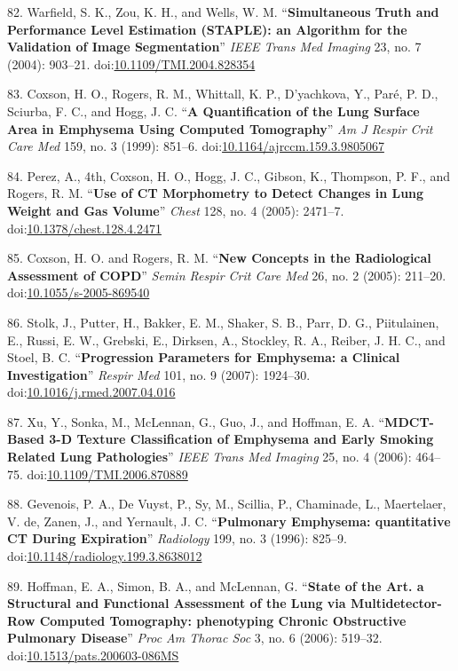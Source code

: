 \documentclass[11pt,]{article}
\begin{document}
82. Warfield, S. K., Zou, K. H., and Wells, W. M. ``\textbf{Simultaneous
Truth and Performance Level Estimation (STAPLE): an Algorithm for the
Validation of Image Segmentation}'' \emph{IEEE Trans Med Imaging} 23,
no. 7 (2004): 903--21.
doi:\href{http://dx.doi.org/10.1109/TMI.2004.828354}{10.1109/TMI.2004.828354}

83. Coxson, H. O., Rogers, R. M., Whittall, K. P., D'yachkova, Y.,
Par{é}, P. D., Sciurba, F. C., and Hogg, J. C. ``\textbf{A
Quantification of the Lung Surface Area in Emphysema Using Computed
Tomography}'' \emph{Am J Respir Crit Care Med} 159, no. 3 (1999):
851--6.
doi:\href{http://dx.doi.org/10.1164/ajrccm.159.3.9805067}{10.1164/ajrccm.159.3.9805067}

84. Perez, A., 4th, Coxson, H. O., Hogg, J. C., Gibson, K., Thompson, P.
F., and Rogers, R. M. ``\textbf{Use of CT Morphometry to Detect Changes
in Lung Weight and Gas Volume}'' \emph{Chest} 128, no. 4 (2005):
2471--7.
doi:\href{http://dx.doi.org/10.1378/chest.128.4.2471}{10.1378/chest.128.4.2471}

85. Coxson, H. O. and Rogers, R. M. ``\textbf{New Concepts in the
Radiological Assessment of COPD}'' \emph{Semin Respir Crit Care Med} 26,
no. 2 (2005): 211--20.
doi:\href{http://dx.doi.org/10.1055/s-2005-869540}{10.1055/s-2005-869540}

86. Stolk, J., Putter, H., Bakker, E. M., Shaker, S. B., Parr, D. G.,
Piitulainen, E., Russi, E. W., Grebski, E., Dirksen, A., Stockley, R.
A., Reiber, J. H. C., and Stoel, B. C. ``\textbf{Progression Parameters
for Emphysema: a Clinical Investigation}'' \emph{Respir Med} 101, no. 9
(2007): 1924--30.
doi:\href{http://dx.doi.org/10.1016/j.rmed.2007.04.016}{10.1016/j.rmed.2007.04.016}

87. Xu, Y., Sonka, M., McLennan, G., Guo, J., and Hoffman, E. A.
``\textbf{MDCT-Based 3-D Texture Classification of Emphysema and Early
Smoking Related Lung Pathologies}'' \emph{IEEE Trans Med Imaging} 25,
no. 4 (2006): 464--75.
doi:\href{http://dx.doi.org/10.1109/TMI.2006.870889}{10.1109/TMI.2006.870889}

88. Gevenois, P. A., De Vuyst, P., Sy, M., Scillia, P., Chaminade, L.,
Maertelaer, V. de, Zanen, J., and Yernault, J. C. ``\textbf{Pulmonary
Emphysema: quantitative CT During Expiration}'' \emph{Radiology} 199,
no. 3 (1996): 825--9.
doi:\href{http://dx.doi.org/10.1148/radiology.199.3.8638012}{10.1148/radiology.199.3.8638012}

89. Hoffman, E. A., Simon, B. A., and McLennan, G. ``\textbf{State of
the Art. a Structural and Functional Assessment of the Lung via
Multidetector-Row Computed Tomography: phenotyping Chronic Obstructive
Pulmonary Disease}'' \emph{Proc Am Thorac Soc} 3, no. 6 (2006): 519--32.
doi:\href{http://dx.doi.org/10.1513/pats.200603-086MS}{10.1513/pats.200603-086MS}
\end{document}
